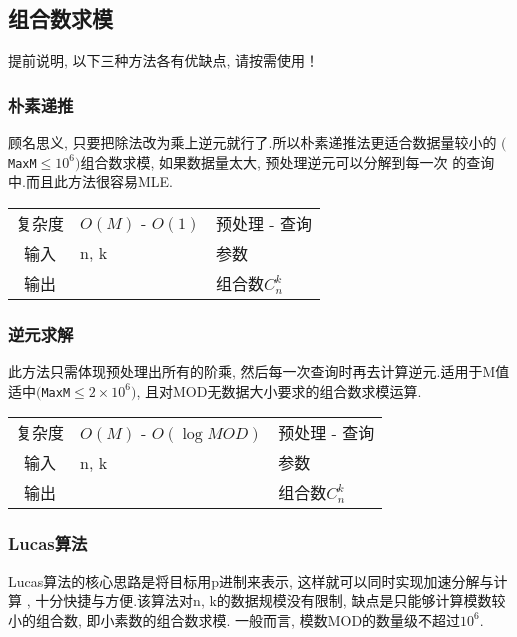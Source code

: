     \subsection{组合数求模}\small
提前说明, 以下三种方法各有优缺点, 请按需使用！


        \subsubsection{朴素递推}\small
顾名思义, 只要把除法改为乘上逆元就行了.所以朴素递推法更适合数据量较小的
$(${\tt MaxM}$ \leq 10^6)$组合数求模, 如果数据量太大, 预处理逆元可以分解到每一次
的查询中.而且此方法很容易MLE.

\begin{longtable}{|c|l|l|}
复杂度 & $O(M)$ - $O(1)$ & 预处理 - 查询 \\
输入 & n, k & 参数 \\
输出 &  & 组合数$C^{k}_{n}$ \\
\end{longtable}



        \subsubsection{逆元求解}\small
此方法只需体现预处理出所有的阶乘, 然后每一次查询时再去计算逆元.适用于M值
适中$(${\tt MaxM}$ \leq 2 \times 10^6)$, 且对MOD无数据大小要求的组合数求模运算.

\begin{longtable}{|c|l|l|}
复杂度 & $O(M)$ - $O(\log MOD)$ & 预处理 - 查询 \\
输入 & n, k & 参数 \\
输出 &  & 组合数$C^{k}_{n}$ \\
\end{longtable}



        \subsubsection{Lucas算法}\small
Lucas算法的核心思路是将目标用p进制来表示, 这样就可以同时实现加速分解与计算
, 十分快捷与方便.该算法对n, k的数据规模没有限制, 缺点是只能够计算模数较小的组合数, 即小素数的组合数求模.
一般而言, 模数MOD的数量级不超过$10^6$.


